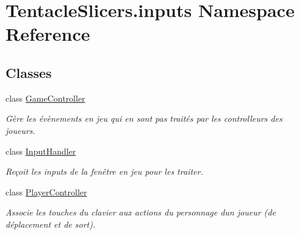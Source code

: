 \hypertarget{namespace_tentacle_slicers_1_1inputs}{}\section{Tentacle\+Slicers.\+inputs Namespace Reference}
\label{namespace_tentacle_slicers_1_1inputs}
\subsection*{Classes}
\begin{DoxyCompactItemize}
\item 
class \hyperlink{class_tentacle_slicers_1_1inputs_1_1_game_controller}{Game\+Controller}
\begin{DoxyCompactList}\small\item\em Gère les évènements en jeu qui en sont pas traités par les controlleurs des joueurs. \end{DoxyCompactList}\item 
class \hyperlink{class_tentacle_slicers_1_1inputs_1_1_input_handler}{Input\+Handler}
\begin{DoxyCompactList}\small\item\em Reçoit les inputs de la fenêtre en jeu pour les traiter. \end{DoxyCompactList}\item 
class \hyperlink{class_tentacle_slicers_1_1inputs_1_1_player_controller}{Player\+Controller}
\begin{DoxyCompactList}\small\item\em Associe les touches du clavier aux actions du personnage d\textquotesingle{}un joueur (de déplacement et de sort). \end{DoxyCompactList}\end{DoxyCompactItemize}
